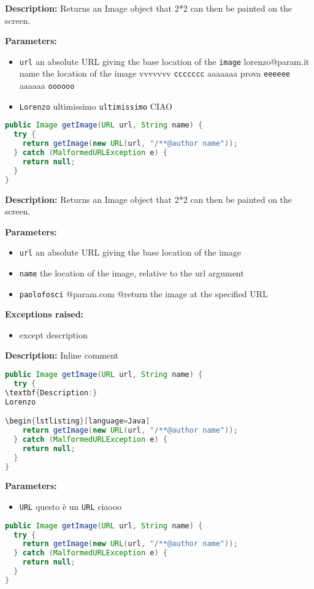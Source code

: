 \textbf{Description:}
Returns an Image object that 2*2 can then be painted on the screen.

\textbf{Parameters:}
\begin{itemize}
  \item\texttt{url}  an absolute URL giving the base location of the \texttt{image}  lorenzo@param.it  name the location of the image vvvvvvv \texttt{ccccccc}  aaaaaaa prova \texttt{eeeeee}  aaaaaa \texttt{oooooo}  
  \item\texttt{Lorenzo} ultimissimo \texttt{ultimissimo}  CIAO
\end{itemize}

\begin{lstlisting}[language=Java]
public Image getImage(URL url, String name) {
  try {
    return getImage(new URL(url, "/**@author name"));
  } catch (MalformedURLException e) {
    return null;
  }
}
\end{lstlisting}
\textbf{Description:}
Returns an Image object that 2*2 can then be painted on the screen.

\textbf{Parameters:}
\begin{itemize}
  \item\texttt{url}  an absolute URL giving the base location of the image 
  \item\texttt{name} the location of the image, relative to the url argument 
  \item\texttt{paolofosci} @param.com @return the image at the specified URL 
\end{itemize}

\textbf{Exceptions raised:}
\begin{itemize}
  \item\texttt{} except description
\end{itemize}

\textbf{Description:}
Inline comment

\begin{lstlisting}[language=Java]
public Image getImage(URL url, String name) {
  try {
\textbf{Description:}
Lorenzo

\begin{lstlisting}[language=Java]
    return getImage(new URL(url, "/**@author name"));
  } catch (MalformedURLException e) {
    return null;
  }
}
\end{lstlisting}
\textbf{Parameters:}
\begin{itemize}
  \item\texttt{URL} questo è un \texttt{URL}  ciaooo
\end{itemize}

\begin{lstlisting}[language=Java]
public Image getImage(URL url, String name) {
  try {
    return getImage(new URL(url, "/**@author name"));
  } catch (MalformedURLException e) {
    return null;
  }
}
\end{lstlisting}
